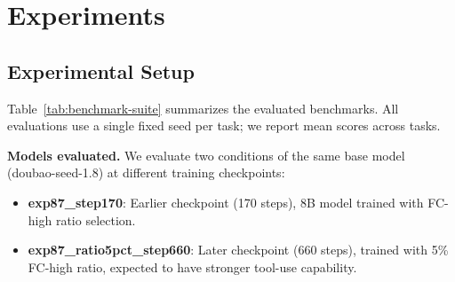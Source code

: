 \section{Experiments}
\label{sec:experiments}


\subsection{Experimental Setup}
\label{sec:exp:setup}

\begin{table}[t]
\centering
\caption{Benchmark suite metadata. AgentBench-OpenClaw (AB-OC): 40 tasks across 7 domains. PinchBench (PB): 23 real-world productivity tasks. Scoring: PinchBench uses a three-tier system (automated + LLM-judge + hybrid); AgentBench-OC uses a 4-layer composite (55\% objective, 45\% self-evaluated). ``Low-scoring tasks'' are those that score below 0.5 on the Base (Seed 1.8) condition; the memory domain on AgentBench-OC is a structural outlier scoring exactly 50.0 across all model variants.}
\label{tab:benchmark-suite}
\end{table}

Table~\ref{tab:benchmark-suite} summarizes the evaluated benchmarks. All evaluations use a single fixed seed per task; we report mean scores across tasks.

\textbf{Models evaluated.} We evaluate two conditions of the same base model (doubao-seed-1.8) at different training checkpoints:
\begin{itemize}[leftmargin=1.5em, itemsep=1pt]
  \item \textbf{exp87\_step170}: Earlier checkpoint (170 steps), 8B model trained with FC-high ratio selection.
  \item \textbf{exp87\_ratio5pct\_step660}: Later checkpoint (660 steps), trained with 5\% FC-high ratio, expected to have stronger tool-use capability.
\end{itemize}

